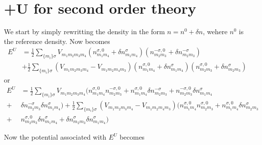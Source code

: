 \section{+U for second order theory}
\par{We start by simply rewritting the density in the form $n=n^0+\delta n$, wehere $n^0$ is the reference density.
Now  becomes}
\begin{equation}
\begin{split}
E^U&=\frac{1}{2}\sum_{\{m_i\}\sigma}V_{m_1m_2m_3m_4}(n_{m_1m_4}^{\sigma, 0}+\delta n_{m_1m_4}^{\sigma})(n_{m_2m_3}^{-\sigma,0}+\delta n_{m_2m_3}^{-\sigma})\\&+
\frac{1}{2}\sum_{\{m_i\}\sigma}(V_{m_1m_2m_3m_4}-V_{m_1m_2m_4m_3})
(n_{m_1m_4}^{\sigma,0}+\delta n_{m_1m_4}^{\sigma})(n_{m_2m_3}^{\sigma,0}+\delta n_{m_2m_3}^{\sigma})
\end{split}
\end{equation}
or
\begin{equation}
\label{eu2}
\begin{split}
E^U&=\frac{1}{2}\sum_{\{m_i\}\sigma}V_{m_1m_2m_3m_4}( n_{m_1m_4}^{\sigma, 0}n_{m_2m_3}^{-\sigma,0}+n_{m_1m_4}^{\sigma, 0}\delta n_{m_2m_3}^{-\sigma}
+ n_{m_2m_3}^{-\sigma,0}\delta n_{m_1m_4}^{\sigma}\\+& \delta n_{m_2m_3}^{-\sigma}\delta n_{m_1m_4}^{\sigma})+
\frac{1}{2}\sum_{\{m_i\}\sigma}(V_{m_1m_2m_3m_4}-V_{m_1m_2m_4m_3})
(n_{m_1m_4}^{\sigma, 0}n_{m_2m_3}^{\sigma,0}+n_{m_1m_4}^{\sigma, 0}\delta n_{m_2m_3}^{\sigma}
\\+& n_{m_2m_3}^{\sigma,0}\delta n_{m_1m_4}^{\sigma}+ \delta n_{m_2m_3}^{\sigma}\delta n_{m_1m_4}^{\sigma})
\end{split}
\end{equation}
\par{Now the potential associated with $E^U$ becomes}

